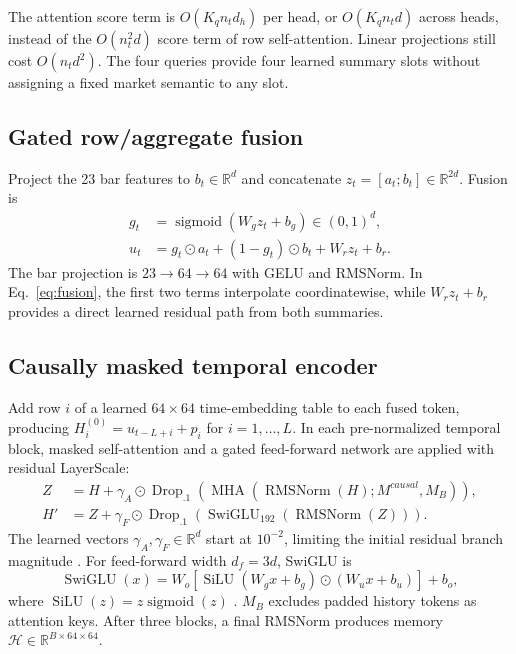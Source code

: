 \documentclass[10pt]{article}
\newcommand{\R}{\mathbb{R}}
\newcommand{\RMSNorm}{\operatorname{RMSNorm}}
\newcommand{\MHA}{\operatorname{MHA}}
\newcommand{\sigmoid}{\operatorname{sigmoid}}
\begin{document}
The attention score term is $O(K_qn_td_h)$ per head, or $O(K_qn_td)$ across heads, instead of the
$O(n_t^2d)$ score term of row self-attention. Linear projections still cost $O(n_td^2)$. The four
queries provide four learned summary slots without assigning a fixed market semantic to any slot.

\subsection{Gated row/aggregate fusion}

Project the 23 bar features to $b_t\in\R^d$ and concatenate $z_t=[a_t;b_t]\in\R^{2d}$. Fusion is
\begin{align}
g_t&=\sigmoid(W_gz_t+b_g)\in(0,1)^d,
\label{eq:fusion-gate}\\
u_t&=g_t\odot a_t+(1-g_t)\odot b_t+W_rz_t+b_r.
\label{eq:fusion}
\end{align}
The bar projection is $23\rightarrow64\rightarrow64$ with GELU and RMSNorm. In
Eq.~\eqref{eq:fusion}, the first two terms interpolate coordinatewise, while $W_rz_t+b_r$ provides a
direct learned residual path from both summaries.

\subsection{Causally masked temporal encoder}
\label{sec:temporal}

Add row $i$ of a learned $64\times64$ time-embedding table to each fused token, producing
$H^{(0)}_i=u_{t-L+i}+p_i$ for $i=1,\ldots,L$. In each pre-normalized temporal block, masked
self-attention and a gated feed-forward network are applied with residual LayerScale:
\begin{align}
Z&=H+\gamma_A\odot\operatorname{Drop}_{.1}\!\left(
\MHA(\RMSNorm(H);M^{causal},M_B)\right),
\label{eq:temporal-attn}\\
H'&=Z+\gamma_F\odot\operatorname{Drop}_{.1}\!\left(
\operatorname{SwiGLU}_{192}(\RMSNorm(Z))\right).
\label{eq:temporal-ffn}
\end{align}
The learned vectors $\gamma_A,\gamma_F\in\R^d$ start at $10^{-2}$, limiting the initial residual
branch magnitude \citep{touvron2021layerscale}. For feed-forward width $d_f=3d$, SwiGLU is
\begin{equation}
\operatorname{SwiGLU}(x)=W_o\left[\operatorname{SiLU}(W_gx+b_g)\odot(W_ux+b_u)\right]+b_o,
\label{eq:swiglu}
\end{equation}
where $\operatorname{SiLU}(z)=z\sigmoid(z)$ \citep{shazeer2020glu}. $M_B$ excludes padded history
tokens as attention keys. After three blocks, a final RMSNorm produces memory
$\mathcal H\in\R^{B\times64\times64}$.
\end{document}
